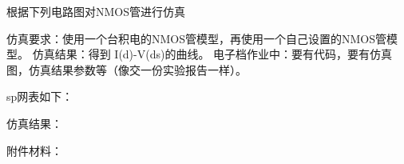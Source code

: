 







根据下列电路图对NMOS管进行仿真



仿真要求：使用一个台积电的NMOS管模型，再使用一个自己设置的NMOS管模型。
仿真结果：得到 I(d)-V(ds)的曲线。
电子档作业中：要有代码，要有仿真图，仿真结果参数等（像交一份实验报告一样）。





sp网表如下：


仿真结果：


附件材料：

